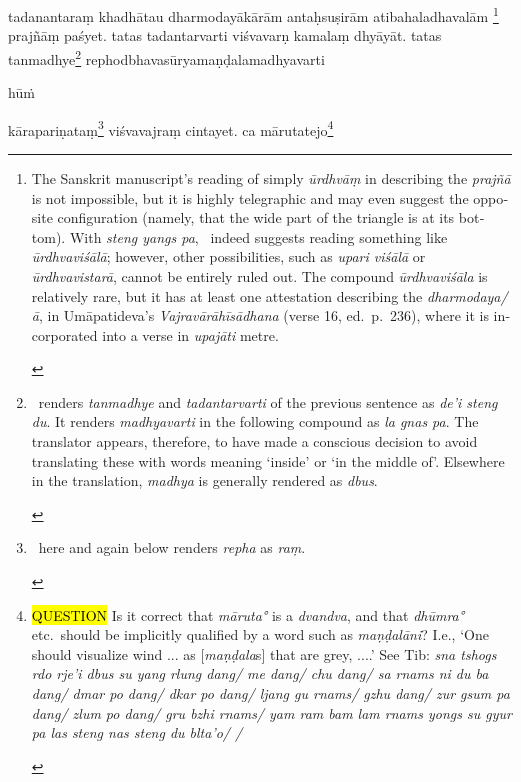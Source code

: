\documentclass[naipra.tex]{subfiles}
\begin{document}
\begin{sanskrit}
\pstart
tadanantaraṃ khadhātau dharmodayākārām antaḥsuṣirām atibahaladhavalām \footnote{
	\begin{english}%
		The Sanskrit manuscript's reading of simply \emph{ūrdhvāṃ} in describing the \emph{prajñā} is not impossible, but it is highly telegraphic and may even suggest the opposite configuration (namely, that the wide part of the triangle is at its bottom).
		With \emph{steng yangs pa}, \TIB\ indeed suggests reading something like \emph{ūrdhvaviśālā}; however, other possibilities, such as \emph{upari viśālā} or \emph{ūrdhvavistarā}, cannot be entirely ruled out.
		The compound \emph{ūrdhvaviśāla} is relatively rare, but it has at least one attestation describing the \emph{dharmodaya/ā}, in Umāpatideva's \emph{Vajravārāhīsādhana} (verse 16, ed.\ p.\ 236), where it is incorporated into a verse in \emph{upajāti} metre.
	\end{english}
} prajñāṃ paśyet.
tatas tadantarvarti viśvavarṇ  kamalaṃ dhyāyāt.
tatas tanmadhye\footnote{
	\begin{english}%
		\TIB\ renders \emph{tanmadhye} and \emph{tadantarvarti} of the previous sentence as \emph{de'i steng du}.
		It renders \emph{madhyavarti} in the following compound as \emph{la gnas pa}. 
		The translator appears, therefore, to have made a conscious decision to avoid translating these with words meaning `inside' or `in the middle of'.
		Elsewhere in the translation, \emph{madhya} is generally rendered as \emph{dbus}.
	\end{english}
} rephodbhavasūryamaṇḍalamadhyavarti\dsh \begin{mantra}hūṁ\end{mantra}\dsh kārapariṇataṃ\footnote{
	\begin{english}%
		\TIB\ here and again below renders \emph{repha} as \emph{raṃ}.
	\end{english}
} viśvavajraṃ cintayet. 
 ca mārutatejo\footnote{
	\begin{english}%
		\hl{QUESTION} Is it correct that \emph{māruta°} is a \emph{dvandva}, and that \emph{dhūmra°} etc.\ should be implicitly qualified by a word such as \emph{maṇḍalāni}? I.e., `One should visualize wind ... as [\emph{maṇḍala}s] that are grey, ....' See Tib: \emph{sna tshogs rdo rje'i dbus su yang rlung dang/ me dang/ chu dang/ sa rnams ni du ba dang/ dmar po dang/ dkar po dang/ ljang gu rnams/ gzhu dang/ zur gsum pa dang/ zlum po dang/ gru bzhi rnams/ yam ram bam lam rnams yongs su gyur pa las steng nas steng du blta'o/ /}

\end{english}}
\end{sanskrit}
\end{document}
